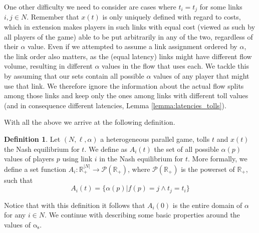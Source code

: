 \documentclass[10pt,a4paper]{book}
\newcommand{\as}{\mathrm{\alpha_s}}
\newcommand{\R}{\mathbb{R}}
\theoremstyle{definition}
\newtheorem{definition}{Definition}[chapter]
\theoremstyle{comment}
\begin{document}
One other difficulty we need to consider are cases where $t_i = t_j$ for some links $i, j \in N$.
Remember that $x(t)$ is only uniquely defined with regard to costs, which in extension makes players in such links with equal cost (viewed as such by all players of the game) able to be put arbitrarily in any of the two, regardless of their $\alpha$ value.
Even if we attempted to assume a link assignment ordered by $\alpha$, the link order also matters, as the (equal latency) links might have different flow volume, resulting in different $\alpha$ values in the flow that uses each.
We tackle this by assuming that our sets contain all possible $\alpha$ values of any player that might use that link.
We therefore ignore the information about the actual flow splits among those links and keep only the ones among links with different toll values (and in consequence different latencies, Lemma \ref{lemma:latencies_tolls}).

With all the above we arrive at the following definition.

\begin{definition}
	\label{definition:alpha_flow_sets}
	Let $(N, \ell, \alpha)$ a heterogeneous parallel game, tolls $t$ and $x(t)$ the Nash equilibrium for $t$.
	We define as $A_i(t)$ the set of all possible $\alpha(p)$ values of players $p$ using link $i$ in the Nash equilibrium for $t$.
	More formally, we define a set function $A_i: \R_+^{|N|} \rightarrow \mathcal{P}(\R_+)$, where $\mathcal{P}(\R_+)$ is the powerset of $\R_+$, such that
	\[A_i(t) = \{\alpha(p) | f(p) = j \wedge t_j = t_i\}\]
\end{definition}

Notice that with this definition it follows that $A_i(0)$ is the entire domain of $\alpha$ for any $i \in N$.
We continue with describing some basic properties around the values of $\as$.

\end{document}
